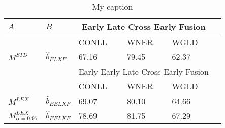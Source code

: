 \begin{table}[h]
\centering
\label{my-label}
\begin{tabular}{@{}llllll@{}}
\toprule
    $A$      &    $B$      & \multicolumn{3}{c}{Early Late Cross Early Fusion}                                            \\ \midrule
          &      &      CONLL                     & WNER                      & WGLD                      \\ \cmidrule{3-5}
$M^{STD}$ & $ \hat{b}_{\scriptscriptstyle ELXF}$ & 67.16                      & 79.45                     & 62.37                     \\
\midrule
          &        &   \multicolumn{3}{c}{Early Early Late Cross Early Fusion}                                             \\
\midrule     
          &          & CONLL                      & WNER                      & WGLD                      \\ \cmidrule{3-5}
$M^{LEX}$ & $ \hat{b}_{\scriptscriptstyle EELXF}$ & 69.07                      & 80.10                     & 64.66                     \\
$M^{LEX}_{\alpha=0.95}$ & $ \hat{b}_{\scriptscriptstyle EELXF}$  & 78.69                      & 81.75                     & 67.29                     \\		
\bottomrule
\end{tabular}
\caption{My caption}
\end{table}

